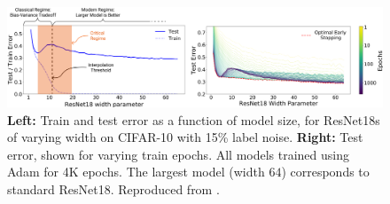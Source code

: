 \begin{figure}[H]
    \centering
    \includegraphics[width=1.05\textwidth]{img/errorvscomplexity.png}
    \caption{{\bf Left:} Train and test error as a function of model size,
    for ResNet18s of varying width 
    on CIFAR-10 with 15\% label noise.
    {\bf Right:}
    Test error, shown for varying train epochs.
    All models trained using Adam for 4K epochs.
    The largest model (width $64$) corresponds to standard ResNet18. Reproduced from \cite{nakkiran_deep_2019}.
    }
    \label{fig:errorvscomplexity}
\end{figure}

